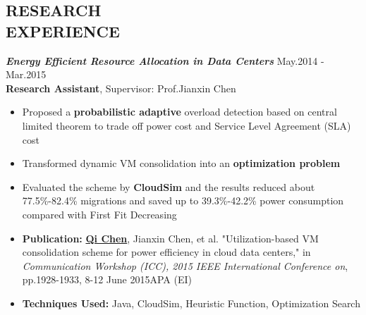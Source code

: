 \documentclass[line,margin]{res}
\begin{document}
\begin{resume}
\section{RESEARCH \\ EXPERIENCE}
        {\sl \textbf{Energy Efficient Resource Allocation in Data Centers}} \hfill May.2014 - Mar.2015 \\[1mm]
        \vspace{0.1mm}
        \quad \textbf{Research Assistant}, Supervisor: Prof.Jianxin Chen
         \vspace{1mm}
        \begin{itemize}
            \item Proposed a \textbf{probabilistic adaptive} overload detection based on central limited theorem to trade off power cost and Service Level Agreement (SLA) cost
	\item Transformed dynamic VM consolidation into an \textbf{optimization problem}
	\item Evaluated the scheme by \textbf{CloudSim} and the results reduced about 77.5\%-82.4\% migrations and saved up to 39.3\%-42.2\% power consumption compared with First Fit Decreasing
\item \textbf{Publication:} \underline{\textbf{Qi Chen}}, Jianxin Chen, et al. "Utilization-based VM consolidation scheme for power efficiency in cloud data centers," in \emph{Communication Workshop (ICC), 2015 IEEE International Conference on}, pp.1928-1933, 8-12 June 2015APA (EI)
\item \textbf{Techniques Used:} Java, CloudSim, Heuristic Function, Optimization Search
        \end{itemize}

\end{resume}
\end{document}
